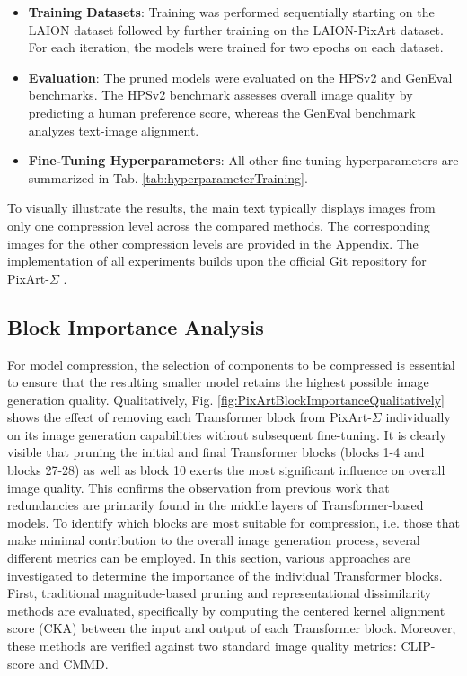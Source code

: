 \begin{itemize}
		
		
	\item \textbf{Training Datasets}: Training was performed sequentially starting on the LAION dataset followed by further training on the LAION-PixArt dataset. For each iteration, the models were trained for two epochs on each dataset.

	\item \textbf{Evaluation}: The pruned models were evaluated on the HPSv2 \cite{HPSv2} and GenEval \cite{ghosh2023geneval} benchmarks. The HPSv2 benchmark assesses overall image quality by predicting a human preference score, whereas the GenEval benchmark analyzes text-image alignment.
	\item \textbf{Fine-Tuning Hyperparameters}: All other fine-tuning hyperparameters are summarized in Tab. \ref{tab:hyperparameterTraining}.

\end{itemize}

To visually illustrate the results, the main text typically displays images from only one compression level across the compared methods. The corresponding images for the other compression levels are provided in the Appendix.
The implementation of all experiments builds upon the official Git repository for PixArt-$\Sigma$ \cite{pixartsigma_code}.

\subsection{Block Importance Analysis}
\label{sec:ExpBlockImportanceAnalysis}
For model compression, the selection of components to be compressed is essential to ensure that the resulting smaller model retains the highest possible image generation quality. Qualitatively, Fig. \ref{fig:PixArtBlockImportanceQualitatively} shows the effect of removing each Transformer block from PixArt-$\Sigma$ individually on its image generation capabilities without subsequent fine-tuning. It is clearly visible that pruning the initial and final Transformer blocks (blocks 1-4 and blocks 27-28) as well as block 10 exerts the most significant influence on overall image quality. This confirms the observation from previous work \cite{men2024shortgpt} that redundancies are primarily found in the middle layers of Transformer-based models. To identify which blocks are most suitable for compression, i.e. those that make minimal contribution to the overall image generation process, several different metrics can be employed. In this section, various approaches are investigated to determine the importance of the individual Transformer blocks. First, traditional magnitude-based pruning and representational dissimilarity methods are evaluated, specifically by computing the centered kernel alignment score (\gls{CKA}) between the input and output of each Transformer block. Moreover, these methods are verified against two standard image quality metrics: \gls{CLIP}-score and \gls{CMMD}. 

